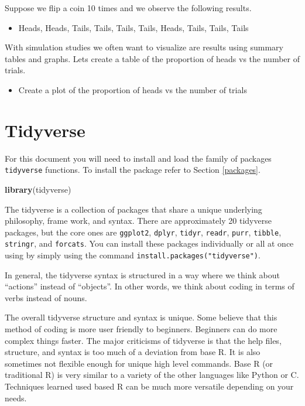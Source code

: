 \documentclass[
]{book}
\newenvironment{Shaded}{\begin{snugshade}}{\end{snugshade}}
\newcommand{\KeywordTok}[1]{\textcolor[rgb]{0.13,0.29,0.53}{\textbf{#1}}}
\newcommand{\NormalTok}[1]{#1}
\providecommand{\tightlist}{%
  \setlength{\itemsep}{0pt}\setlength{\parskip}{0pt}}
\begin{document}
Suppose we flip a coin 10 times and we observe the following results.

\begin{itemize}
\tightlist
\item
  Heads, Heads, Tails, Tails, Tails, Tails, Heads, Tails, Tails, Tails
\end{itemize}

With simulation studies we often want to visualize are results using summary tables and graphs. Lets create a table of the proportion of heads vs the number of trials.

\begin{itemize}
\tightlist
\item
  Create a plot of the proportion of heads vs the number of trials
\end{itemize}

\hypertarget{tidyverse}{%
\chapter{Tidyverse}\label{tidyverse}}

For this document you will need to install and load the family of packages \texttt{tidyverse} functions. To install the package refer to Section \ref{packages}.

\begin{Shaded}
\begin{Highlighting}[]
\KeywordTok{library}\NormalTok{(tidyverse)}
\end{Highlighting}
\end{Shaded}

The tidyverse is a collection of packages that share a unique underlying philosophy, frame work, and syntax. There are approximately 20 tidyverse packages, but the core ones are \texttt{ggplot2}, \texttt{dplyr}, \texttt{tidyr}, \texttt{readr}, \texttt{purr}, \texttt{tibble}, \texttt{stringr}, and \texttt{forcats}. You can install these packages individually or all at once using by simply using the command \texttt{install.packages("tidyverse")}.

In general, the tidyverse syntax is structured in a way where we think about ``actions'' instead of ``objects''. In other words, we think about coding in terms of verbs instead of nouns.

The overall tidyverse structure and syntax is unique. Some believe that this method of coding is more user friendly to beginners. Beginners can do more complex things faster. The major criticisms of tidyverse is that the help files, structure, and syntax is too much of a deviation from base R. It is also sometimes not flexible enough for unique high level commands. Base R (or traditional R) is very similar to a variety of the other languages like Python or C. Techniques learned used based R can be much more versatile depending on your needs.
\end{document}
